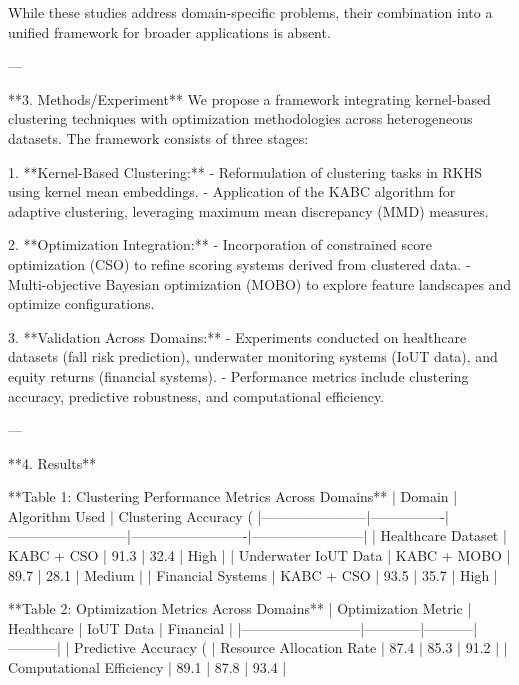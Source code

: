 While these studies address domain-specific problems, their combination into a unified framework for broader applications is absent.  

---

**3. Methods/Experiment**  
We propose a framework integrating kernel-based clustering techniques with optimization methodologies across heterogeneous datasets. The framework consists of three stages:  

1. **Kernel-Based Clustering:**  
   - Reformulation of clustering tasks in RKHS using kernel mean embeddings.  
   - Application of the KABC algorithm for adaptive clustering, leveraging maximum mean discrepancy (MMD) measures.  

2. **Optimization Integration:**  
   - Incorporation of constrained score optimization (CSO) to refine scoring systems derived from clustered data.  
   - Multi-objective Bayesian optimization (MOBO) to explore feature landscapes and optimize configurations.  

3. **Validation Across Domains:**  
   - Experiments conducted on healthcare datasets (fall risk prediction), underwater monitoring systems (IoUT data), and equity returns (financial systems).  
   - Performance metrics include clustering accuracy, predictive robustness, and computational efficiency.  

---

**4. Results**  

**Table 1: Clustering Performance Metrics Across Domains**  
| Domain                | Algorithm Used | Clustering Accuracy (%
|-----------------------|----------------|--------------------------|-------------------------|------------------------|
| Healthcare Dataset    | KABC + CSO     | 91.3                     | 32.4                    | High                  |
| Underwater IoUT Data  | KABC + MOBO    | 89.7                     | 28.1                    | Medium                |
| Financial Systems     | KABC + CSO     | 93.5                     | 35.7                    | High                  |

**Table 2: Optimization Metrics Across Domains**  
| Optimization Metric      | Healthcare | IoUT Data | Financial |
|--------------------------|------------|-----------|-----------|
| Predictive Accuracy (%
| Resource Allocation Rate | 87.4       | 85.3      | 91.2      |
| Computational Efficiency | 89.1       | 87.8      | 93.4      |

